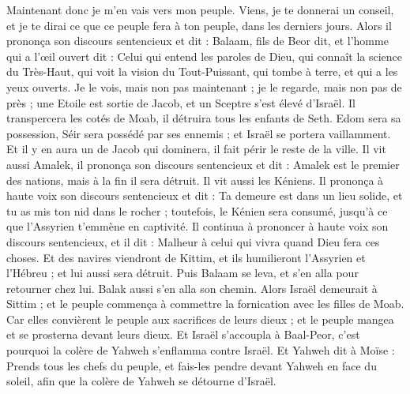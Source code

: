 \begin{multicols}{2}
Maintenant donc je m'en vais vers mon peuple. Viens, je te donnerai un conseil, et je te dirai ce que ce peuple fera à ton peuple, dans les derniers jours.
Alors il prononça son discours sentencieux et dit : Balaam, fils de Beor dit, et l'homme qui a l'œil ouvert dit :
Celui qui entend les paroles de Dieu, qui connaît la science du Très-Haut, qui voit la vision du Tout-Puissant, qui tombe à terre, et qui a les yeux ouverts.
Je le vois, mais non pas maintenant ; je le regarde, mais non pas de près ; une Etoile est sortie de Jacob, et un Sceptre s'est élevé d'Israël. Il transpercera les cotés de Moab, il détruira tous les enfants de Seth.
Edom sera sa possession, Séir sera possédé par ses ennemis ; et Israël se portera vaillamment.
Et il y en aura un de Jacob qui dominera, il fait périr le reste de la ville.
Il vit aussi Amalek, il prononça son discours sentencieux et dit : Amalek est le premier des nations, mais à la fin il sera détruit.
Il vit aussi les Kéniens. Il prononça à haute voix son discours sentencieux et dit : Ta demeure est dans un lieu solide, et tu as mis ton nid dans le rocher ;
toutefois, le Kénien sera consumé, jusqu'à ce que l'Assyrien t'emmène en captivité.
Il continua à prononcer à haute voix son discours sentencieux, et il dit : Malheur à celui qui vivra quand Dieu fera ces choses.
Et des navires viendront de Kittim, et ils humilieront l'Assyrien et l'Hébreu ; et lui aussi sera détruit.
Puis Balaam se leva, et s'en alla pour retourner chez lui. Balak aussi s'en alla son chemin.
\VerseOne{}Alors Israël demeurait à Sittim ; et le peuple commença à commettre la fornication avec les filles de Moab.
Car elles convièrent le peuple aux sacrifices de leurs dieux ; et le peuple mangea et se prosterna devant leurs dieux.
Et Israël s'accoupla à Baal-Peor, c'est pourquoi la colère de Yahweh s'enflamma contre Israël.
Et Yahweh dit à Moïse : Prends tous les chefs du peuple, et fais-les pendre  devant Yahweh en face du soleil, afin que la colère de Yahweh se détourne d'Israël.

\end{multicols}
